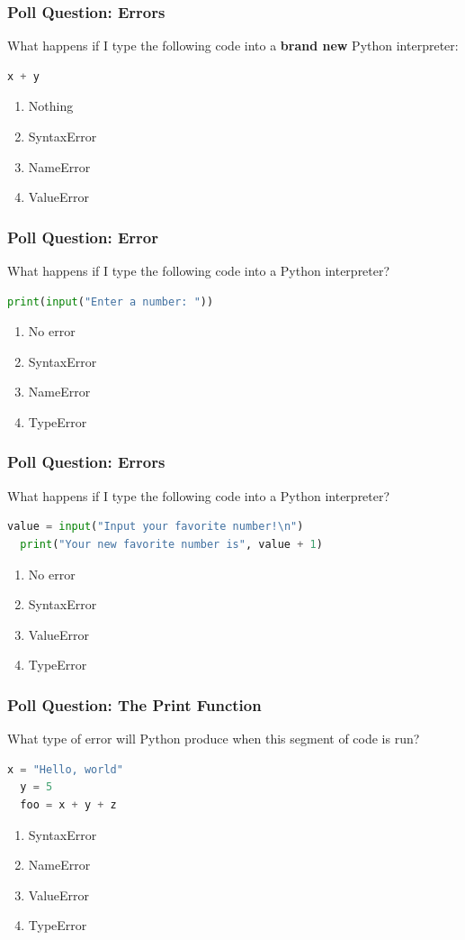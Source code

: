 \documentclass{beamer}
\begin{document}
%
%
%
\begin{frame}[fragile]
  \frametitle{Poll Question: Errors}
  What happens if I type the following code into a \textbf{brand new} Python interpreter:
  \begin{lstlisting}[language=Python]
  x + y \end{lstlisting}
  \begin{enumerate}[A]
    \item Nothing
    \item SyntaxError
    \item NameError
    \item ValueError
  \end{enumerate}
\end{frame}

%
%
%
\begin{frame}[fragile]
  \frametitle{Poll Question: Error}
  What happens if I type the following code into a Python interpreter?
  \begin{lstlisting}[language=Python]
  print(input("Enter a number: "))\end{lstlisting}
  \begin{enumerate}[A]
    \item No error
    \item SyntaxError
    \item NameError
    \item TypeError
  \end{enumerate}
\end{frame}

%
%
%
\begin{frame}[fragile]
  \frametitle{Poll Question: Errors}
  What happens if I type the following code into a Python interpreter?
  \begin{lstlisting}[language=Python]
  value = input("Input your favorite number!\n")
  print("Your new favorite number is", value + 1)\end{lstlisting}
  \begin{enumerate}[A]
    \item No error
    \item SyntaxError
    \item ValueError
    \item TypeError
  \end{enumerate}
\end{frame}

%
%
%
\begin{frame}[fragile]
  \frametitle{Poll Question: The Print Function}
  What type of error will Python produce when this segment of code is run?
  \begin{lstlisting}[language=Python]
  x = "Hello, world"
  y = 5
  foo = x + y + z\end{lstlisting}
  \begin{enumerate}[A]
    \item SyntaxError
    \item NameError
    \item ValueError
    \item TypeError
  \end{enumerate}
\end{frame}
\end{document}
